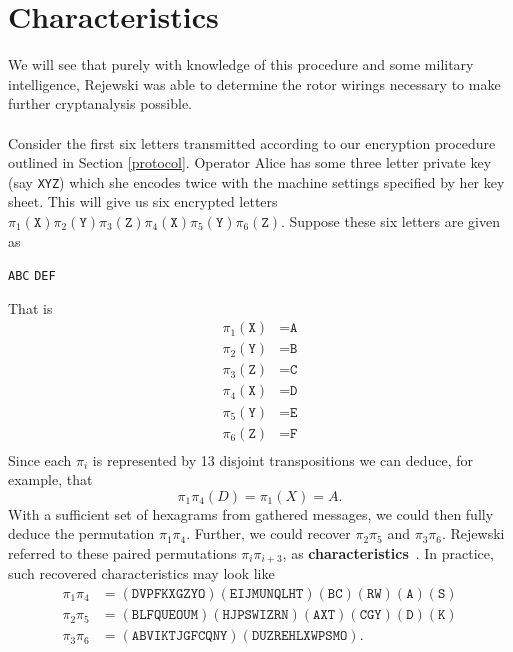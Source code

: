 \section{Characteristics}
We will see that purely with knowledge of this procedure and some
military intelligence, Rejewski was able to determine the rotor
wirings necessary to make further cryptanalysis possible.
\\\\Consider the first six letters transmitted according to our
encryption procedure outlined in Section \ref{protocol}. Operator Alice has
some three letter private
key (say \texttt{XYZ}) which she encodes twice with the machine
settings specified by her key sheet. This will give us six encrypted
letters
$\pi_1(\texttt{X})\pi_2(\texttt{Y})\pi_3(\texttt{Z})\pi_4(\texttt{X})\pi_5(\texttt{Y})\pi_6(\texttt{Z})$.
Suppose these six letters are given as
\begin{center}
  \texttt{ABC} \texttt{DEF}
\end{center}
That is
\begin{align*}
  \pi_1(\texttt{X}) & = \texttt{A} \\
  \pi_2(\texttt{Y}) & = \texttt{B} \\
  \pi_3(\texttt{Z}) & = \texttt{C} \\
  \pi_4(\texttt{X}) & = \texttt{D} \\
  \pi_5(\texttt{Y}) & = \texttt{E} \\
  \pi_6(\texttt{Z}) & = \texttt{F} \\
\end{align*}
Since each $\pi_i$ is represented by 13 disjoint transpositions we
can deduce, for example, that
\[
  \pi_1\pi_4(D) = \pi_1(X) = A.
\]
With a sufficient set of hexagrams from gathered messages, we could
then fully deduce the permutation $\pi_1\pi_4$. Further, we
could recover $\pi_2\pi_5$ and $\pi_3\pi_6$. Rejewski
referred to these paired permutations $\pi_i\pi_{i+3}$, as
{\bf{characteristics}}~\cite[p.~217]{Rejewski1981}. In
practice, such recovered characteristics may look like
\begin{align*}
  \pi_1\pi_4 & =
  (\texttt{DVPFKXGZYO})(\texttt{EIJMUNQLHT})(\texttt{BC})(\texttt{RW})(\texttt{A})(\texttt{S})
  \\
  \pi_2\pi_5 & =
  (\texttt{BLFQUEOUM})(\texttt{HJPSWIZRN})(\texttt{AXT})(\texttt{CGY})(\texttt{D})(\texttt{K})
  \\
  \pi_3\pi_6 & = (\texttt{ABVIKTJGFCQNY})(\texttt{DUZREHLXWPSMO}).
\end{align*}
